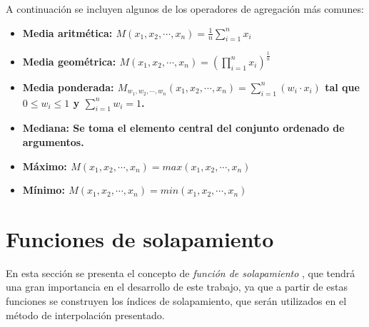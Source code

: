 A continuación se incluyen algunos de los operadores de agregación más comunes:
\begin{itemize}
	\item \bfseries Media aritmética: $M(x_{1},x_{2},\cdots,x_{n}) = \frac{1}{n}\sum\limits_{i=1}^{n}x_{i}$
	\item \bfseries Media geométrica: $M(x_{1},x_{2},\cdots,x_{n}) = (\prod\limits_{i=1}^{n}x_{i})^{\frac{1}{n}}$
	\item \bfseries Media ponderada: $M_{w_{1},w_{2},\cdots,w_{n}}(x_{1},x_{2},\cdots,x_{n}) =\sum\limits_{i=1}^{n}(w_{i}\cdot x_{i})$ \normalfont tal que $0 \leq w_{i} \leq 1$ y $\sum\limits_{i=1}^{n}w_{i} = 1$.
	\item \bfseries Mediana: \normalfont Se toma el elemento central del conjunto ordenado de argumentos.
	\item \bfseries Máximo: $M(x_{1},x_{2},\cdots,x_{n}) = max(x_{1},x_{2},\cdots,x_{n})$
	\item \bfseries Mínimo: $M(x_{1},x_{2},\cdots,x_{n}) = min(x_{1},x_{2},\cdots,x_{n})$
\end{itemize}

\section{Funciones de solapamiento}\label{sec:overlap-functions}
En esta sección se presenta el concepto de \emph{función de solapamiento} \cite{bustince2009overlap,bustince2010overlapfunctions,bustince2012pairwisecomparisons,jurio2013propertiesoverlap}, que tendrá una gran importancia en el desarrollo de este trabajo, ya que a partir de estas funciones se construyen los índices de solapamiento, que serán utilizados en el método de interpolación presentado.
